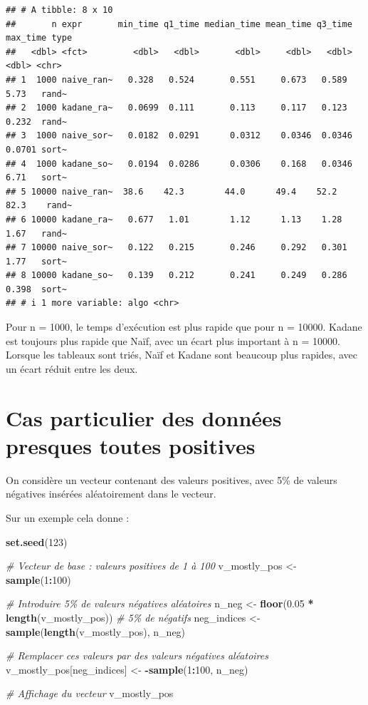 \documentclass[
]{article}
\newenvironment{Shaded}{\begin{snugshade}}{\end{snugshade}}
\newcommand{\CommentTok}[1]{\textcolor[rgb]{0.56,0.35,0.01}{\textit{#1}}}
\newcommand{\DecValTok}[1]{\textcolor[rgb]{0.00,0.00,0.81}{#1}}
\newcommand{\FloatTok}[1]{\textcolor[rgb]{0.00,0.00,0.81}{#1}}
\newcommand{\FunctionTok}[1]{\textcolor[rgb]{0.13,0.29,0.53}{\textbf{#1}}}
\newcommand{\NormalTok}[1]{#1}
\newcommand{\OtherTok}[1]{\textcolor[rgb]{0.56,0.35,0.01}{#1}}
\newcommand{\SpecialCharTok}[1]{\textcolor[rgb]{0.81,0.36,0.00}{\textbf{#1}}}
\begin{document}
\begin{verbatim}
## # A tibble: 8 x 10
##       n expr       min_time q1_time median_time mean_time q3_time max_time type 
##   <dbl> <fct>         <dbl>   <dbl>       <dbl>     <dbl>   <dbl>    <dbl> <chr>
## 1  1000 naive_ran~   0.328   0.524       0.551     0.673   0.589    5.73   rand~
## 2  1000 kadane_ra~   0.0699  0.111       0.113     0.117   0.123    0.232  rand~
## 3  1000 naive_sor~   0.0182  0.0291      0.0312    0.0346  0.0346   0.0701 sort~
## 4  1000 kadane_so~   0.0194  0.0286      0.0306    0.168   0.0346   6.71   sort~
## 5 10000 naive_ran~  38.6    42.3        44.0      49.4    52.2     82.3    rand~
## 6 10000 kadane_ra~   0.677   1.01        1.12      1.13    1.28     1.67   rand~
## 7 10000 naive_sor~   0.122   0.215       0.246     0.292   0.301    1.77   sort~
## 8 10000 kadane_so~   0.139   0.212       0.241     0.249   0.286    0.398  sort~
## # i 1 more variable: algo <chr>
\end{verbatim}

Pour n = 1000, le temps d'exécution est plus rapide que pour n = 10000.
Kadane est toujours plus rapide que Naïf, avec un écart plus important à
n = 10000. Lorsque les tableaux sont triés, Naïf et Kadane sont beaucoup
plus rapides, avec un écart réduit entre les deux.

\section{Cas particulier des données presques toutes
positives}\label{cas-particulier-des-donnuxe9es-presques-toutes-positives}

On considère un vecteur contenant des valeurs positives, avec 5\% de
valeurs négatives insérées aléatoirement dans le vecteur.

Sur un exemple cela donne :

\begin{Shaded}
\begin{Highlighting}[]
\FunctionTok{set.seed}\NormalTok{(}\DecValTok{123}\NormalTok{)}

\CommentTok{\# Vecteur de base : valeurs positives de 1 à 100}
\NormalTok{v\_mostly\_pos }\OtherTok{\textless{}{-}} \FunctionTok{sample}\NormalTok{(}\DecValTok{1}\SpecialCharTok{:}\DecValTok{100}\NormalTok{)}

\CommentTok{\# Introduire 5\% de valeurs négatives aléatoires}
\NormalTok{n\_neg }\OtherTok{\textless{}{-}} \FunctionTok{floor}\NormalTok{(}\FloatTok{0.05} \SpecialCharTok{*} \FunctionTok{length}\NormalTok{(v\_mostly\_pos))  }\CommentTok{\# 5\% de négatifs}
\NormalTok{neg\_indices }\OtherTok{\textless{}{-}} \FunctionTok{sample}\NormalTok{(}\FunctionTok{length}\NormalTok{(v\_mostly\_pos), n\_neg)}

\CommentTok{\# Remplacer ces valeurs par des valeurs négatives aléatoires}
\NormalTok{v\_mostly\_pos[neg\_indices] }\OtherTok{\textless{}{-}} \SpecialCharTok{{-}}\FunctionTok{sample}\NormalTok{(}\DecValTok{1}\SpecialCharTok{:}\DecValTok{100}\NormalTok{, n\_neg)}

\CommentTok{\# Affichage du vecteur}
\NormalTok{v\_mostly\_pos}
\end{Highlighting}
\end{Shaded}
\end{document}
